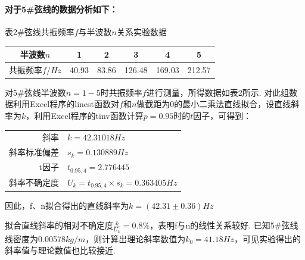 \documentclass[UTF8]{ctexart}
\begin{document}
\paragraph{对于5\#弦线的数据分析如下：}
\begin{center}
{\kaishu 表2\#弦线共振频率$f$与半波数$n$关系实验数据}
\begin{tabular}{|c|c|c|c|c|c|}
\hline
	{半波数\tiny\quad\normalsize$n$}&1&2&3&4&5\\
\hline
	{共振频率$f/Hz$}&{40.93}&{83.86}&{126.48}&{169.03}&{212.57}\\
\hline
\end{tabular}
\end{center}
\par 对5\#弦线半波数$n = 1 - 5$时共振频率$f$进行测量，所得数据如表2所示. 对此组数据利用Excel程序的linest函数对$f$和$n$做截距为0的最小二乘法直线拟合，设直线斜率为$k$，利用Excel程序的tinv函数计算$p = 0.95$时的$t$因子，可得到：\par
\begin{center}\begin{tabular}{r l}
{斜率}& {$k=42.31018Hz$}\\
{斜率标准偏差}& {$s_k=0.130889Hz$}\\
{t因子}& {$t_{0.95,4}=2.776445$}\\
{斜率不确定度}& {$U_k=t_{0.95,4}\times s_k = 0.363405Hz$}
\end{tabular}\end{center}
因此，f、n拟合得出的直线斜率为$k=(42.31\pm0.36)Hz$\par
\begin{figure}[H]\centering{}
\end{figure}
拟合直线斜率的相对不确定度$\frac{k}{U_k} = 0.8\%$，表明f与n的线性关系较好. 已知5\#弦线线密度为0.00578$kg/m$，则计算出理论斜率数值为$k_0=41.18Hz$，可见实验得出的斜率值与理论数值也比较接近.
\end{document}
